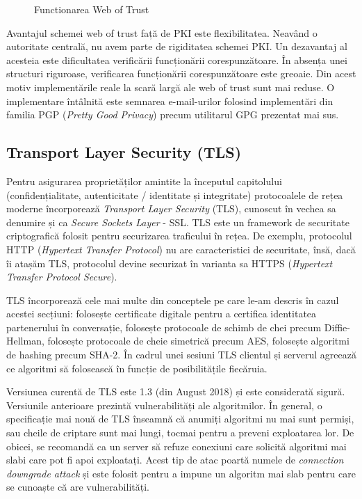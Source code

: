 \begin{figure}[htbp]
  \centering
  \def\svgwidth{\columnwidth}
  
  \caption{Functionarea Web of Trust}
  \label{fig:sec:web-of-trust}
\end{figure}

Avantajul schemei web of trust față de PKI este flexibilitatea.
Neavând o autoritate centrală, nu avem parte de rigiditatea schemei PKI.
Un dezavantaj al acesteia este dificultatea verificării funcționării corespunzătoare.
În absența unei structuri riguroase, verificarea funcționării corespunzătoare este greoaie.
Din acest motiv implementările reale la scară largă ale web of trust sunt mai reduse.
O implementare întâlnită este semnarea e-mail-urilor folosind implementări din familia PGP  (\textit{Pretty Good Privacy}) precum utilitarul GPG prezentat mai sus.

\subsection{Transport Layer Security (TLS)}
\label{sec:sec:transfer:tls}

Pentru asigurarea proprietăților amintite la începutul capitolului (confidențialitate, autenticitate / identitate și integritate) protocoalele de rețea moderne încorporează \textit{Transport Layer Security} (TLS), cunoscut în vechea sa denumire și ca \textit{Secure Sockets Layer} - SSL.
TLS este un framework de securitate criptografică folosit pentru securizarea traficului în rețea.
De exemplu, protocolul HTTP (\textit{Hypertext Transfer Protocol}) nu are caracteristici de securitate, însă, dacă îi atașăm TLS, protocolul devine securizat în varianta sa HTTPS  (\textit{Hypertext Transfer Protocol Secure}).

TLS încorporează cele mai multe din conceptele pe care le-am descris în cazul acestei secțiuni: folosește certificate digitale pentru a certifica identitatea partenerului în conversație, folosește protocoale de schimb de chei precum Diffie-Hellman, folosește protocoale de cheie simetrică precum AES, folosește algoritmi de hashing precum SHA-2.
În cadrul unei sesiuni TLS clientul și serverul agreează ce algoritmi să folosească în funcție de posibilitățile fiecăruia.

Versiunea curentă de TLS este 1.3 (din August 2018) și este considerată sigură.
Versiunile anterioare prezintă vulnerabilități ale algoritmilor.
În general, o specificație mai nouă de TLS înseamnă că anumiți algoritmi nu mai sunt permiși, sau cheile de criptare sunt mai lungi, tocmai pentru a preveni exploatarea lor.
De obicei, se recomandă ca un server să refuze conexiuni care solicită algoritmi mai slabi care pot fi apoi exploatați.
Acest tip de atac poartă numele de \textit{connection downgrade attack} și este folosit pentru a impune un algoritm mai slab pentru care se cunoaște că are vulnerabilități.

